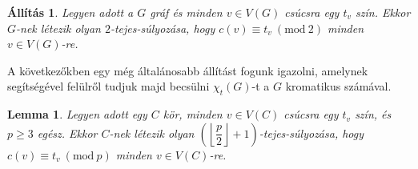 \documentclass[12pt, a4paper]{report}
\newtheorem{lem}[tét]{Lemma}
\newtheorem{áll}[tét]{Állítás}
\theoremstyle{remark}
\theoremstyle{definition}
\begin{document}
\begin{áll}
Legyen adott a $G$ gráf és minden $v \in V(G)$ csúcsra egy $t_v$ szín. Ekkor $G$-nek létezik olyan $2$-tejes-súlyozása, hogy $c(v) ≡ t_v\ (\mathrm{mod}\ 2)$ minden $v \in V(G)$-re. 
\end{áll}

A következőkben egy még általánosabb állítást fogunk igazolni, amelynek segítségével felülről tudjuk majd becsülni $\chi_t(G)$-t a $G$ kromatikus számával.

\begin{lem} \label{lem:12circle}
Legyen adott egy $C$ kör, minden $v \in V(C)$ csúcsra egy $t_v$ szín, és $p \geq 3$ egész. Ekkor $C$-nek létezik olyan $\left( \left\lfloor \dfrac{p}{2} \right\rfloor + 1 \right)$-tejes-súlyozása, hogy $c(v) ≡ t_v\ (\mathrm{mod}\ p)$ minden $v \in V(C)$-re.
\end{lem}
\end{document}
